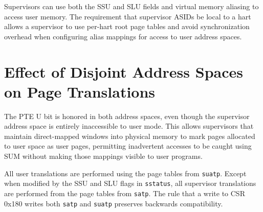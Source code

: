\begin{commentary}
Supervisors can use both the SSU and SLU fields and virtual memory aliasing
to access user memory.  The requirement that supervisor ASIDs be local to a
hart allows a supervisor to use per-hart root page tables and avoid
synchronization overhead when configuring alias mappings for access to user
address spaces.
\end{commentary}

\section{Effect of Disjoint Address Spaces on Page Translations}

The PTE U bit is honored in both address spaces, even though the supervisor
address space is entirely inaccessible to user mode.  This allows
supervisors that maintain direct-mapped windows into physical memory to
mark pages allocated to user space as user pages, permitting inadvertent
accesses to be caught using SUM without making those mappings visible to
user programs.

All user translations are performed using the page tables from {\tt suatp}.
Except when modified by the SSU and SLU flags in {\tt sstatus}, all
supervisor translations are performed from the page tables from {\tt satp}.
The rule that a write to CSR 0x180 writes both {\tt satp} and {\tt suatp}
preserves backwards compatibility.
